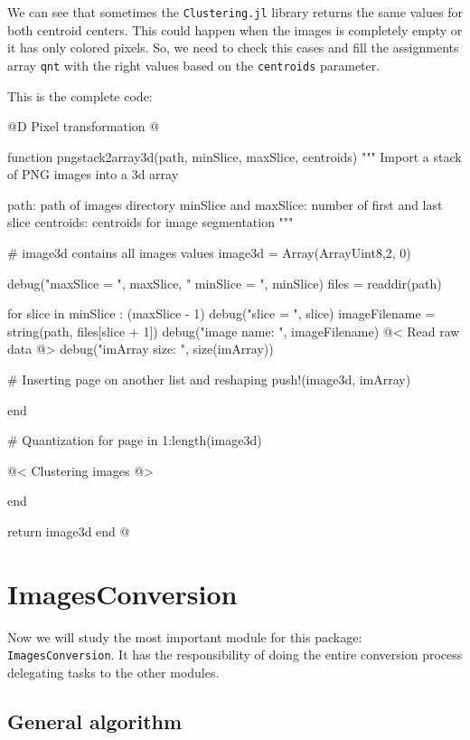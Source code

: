 \documentclass[11pt,oneside]{article}	%
\begin{document}
We can see that sometimes the \texttt{Clustering.jl} library returns the same values for both centroid centers. This could happen when the images is completely empty or it has only colored pixels. So, we need to check this cases and fill the assignments array \texttt{qnt} with the right values based on the \texttt{centroids} parameter.

This is the complete code:

@D Pixel transformation
@{function pngstack2array3d(path, minSlice, maxSlice, centroids)
  """
  Import a stack of PNG images into a 3d array

  path: path of images directory
  minSlice and maxSlice: number of first and last slice
  centroids: centroids for image segmentation
  """

  # image3d contains all images values
  image3d = Array(Array{Uint8,2}, 0)

  debug("maxSlice = ", maxSlice, " minSlice = ", minSlice)
  files = readdir(path)

  for slice in minSlice : (maxSlice - 1)
    debug("slice = ", slice)
    imageFilename = string(path, files[slice + 1])
    debug("image name: ", imageFilename)
    @< Read raw data @>
    debug("imArray size: ", size(imArray))

    # Inserting page on another list and reshaping
    push!(image3d, imArray)

  end

  # Quantization
  for page in 1:length(image3d)

    @< Clustering images @>

  end

  return image3d
end
@}

\section{ImagesConversion}\label{sec:ImagesConversion}
Now we will study the most important module for this package: \texttt{ImagesConversion}. It has the responsibility of doing the entire conversion process delegating tasks to the other modules.

\subsection{General algorithm}\label{sec:generalAlgorithm}
\end{document}
